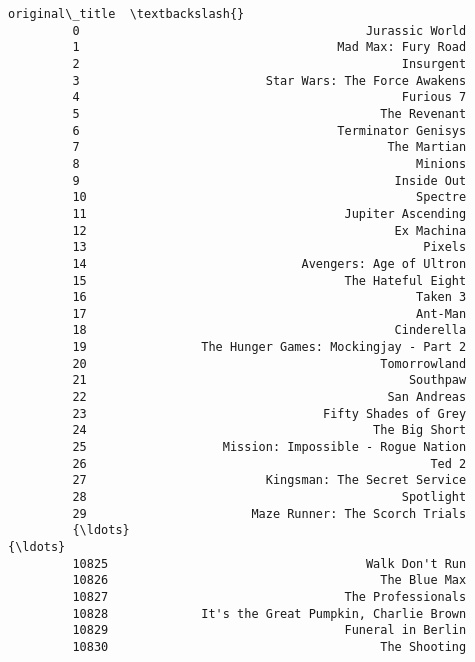 \documentclass[11pt]{article}
\begin{document}
\begin{Verbatim}[commandchars=\\\{\}]
                                                  original\_title  \textbackslash{}
         0                                        Jurassic World   
         1                                    Mad Max: Fury Road   
         2                                             Insurgent   
         3                          Star Wars: The Force Awakens   
         4                                             Furious 7   
         5                                          The Revenant   
         6                                    Terminator Genisys   
         7                                           The Martian   
         8                                               Minions   
         9                                            Inside Out   
         10                                              Spectre   
         11                                    Jupiter Ascending   
         12                                           Ex Machina   
         13                                               Pixels   
         14                              Avengers: Age of Ultron   
         15                                    The Hateful Eight   
         16                                              Taken 3   
         17                                              Ant-Man   
         18                                           Cinderella   
         19                The Hunger Games: Mockingjay - Part 2   
         20                                         Tomorrowland   
         21                                             Southpaw   
         22                                          San Andreas   
         23                                 Fifty Shades of Grey   
         24                                        The Big Short   
         25                   Mission: Impossible - Rogue Nation   
         26                                                Ted 2   
         27                         Kingsman: The Secret Service   
         28                                            Spotlight   
         29                       Maze Runner: The Scorch Trials   
         {\ldots}                                                 {\ldots}   
         10825                                    Walk Don't Run   
         10826                                      The Blue Max   
         10827                                 The Professionals   
         10828             It's the Great Pumpkin, Charlie Brown   
         10829                                 Funeral in Berlin   
         10830                                      The Shooting   

\end{Verbatim}
\end{document}
